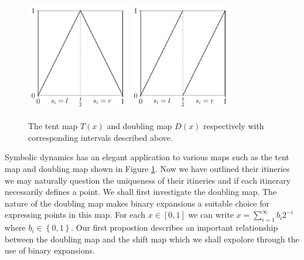 \documentclass[11pt,a4paper,oneside]{memoir}
\theoremstyle{plain}
\theoremstyle{definition}
\begin{document}
\begin{figure}[h]
    \centering
    \includegraphics[width=4.5cm]{tent_symbolic}
    \includegraphics[width=4.5cm]{doubling_symbolic}
    \caption{The tent map $T(x)$ and doubling map $D(x)$ respectively with corresponding intervals described above.}
    \label{fig:tent-doubling}
\end{figure}

Symbolic dynamics has an elegant application to various maps such as the tent map and doubling map shown in Figure \ref{fig:tent-doubling}. Now we have outlined their itineries we may naturally question the uniqueness of their itineries and if each itinerary necessarily defines a point. We shall first investigate the doubling map. The nature of the doubling map makes binary expansions a suitable choice for expressing points in this map. For each $x \in [0, 1]$ we can write $x=\sum_{i=1}^{\infty}b_i2^{-i}$ where $b_i \in \left\lbrace 0, 1 \right\rbrace$. Our first propostion describes an important relationship between the doubling map and the shift map which we shall expolore through the use of binary expansions.
\end{document}
